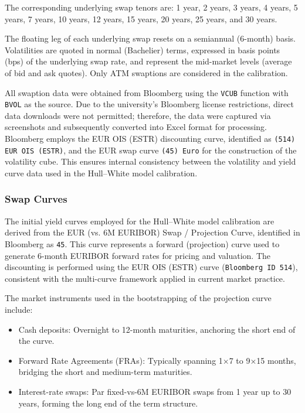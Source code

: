 The corresponding underlying swap tenors are:
1 year, 2 years, 3 years, 4 years, 5 years, 7 years, 10 years, 12 years, 15 years, 20 years, 25 years, and 30 years.

The floating leg of each underlying swap resets on a semiannual (6-month) basis. Volatilities are quoted in normal (Bachelier) terms, expressed in basis points (bps) of the underlying swap rate, and represent the mid-market levels (average of bid and ask quotes). Only ATM swaptions are considered in the calibration.

All swaption data were obtained from Bloomberg using the \texttt{VCUB} function with \texttt{BVOL} as the source. Due to the university's Bloomberg license restrictions, direct data downloads were not permitted; therefore, the data were captured via screenshots and subsequently converted into Excel format for processing. Bloomberg employs the EUR OIS (ESTR) discounting curve, identified as \texttt{(514) EUR OIS (ESTR)}, and the EUR swap curve \texttt{(45) Euro} for the construction of the volatility cube. This ensures internal consistency between the volatility and yield curve data used in the Hull–White model calibration.

\subsubsection{Swap Curves}
The initial yield curves employed for the Hull–White model calibration are derived from the EUR (vs. 6M EURIBOR) Swap / Projection Curve, identified in Bloomberg as \texttt{45}. This curve represents a forward (projection) curve used to generate 6-month EURIBOR forward rates for pricing and valuation. The discounting is performed using the EUR OIS (ESTR) curve (\texttt{Bloomberg ID 514}), consistent with the multi-curve framework applied in current market practice.

The market instruments used in the bootstrapping of the projection curve include:
\begin{itemize}
	\item Cash deposits: Overnight to 12-month maturities, anchoring the short end of the curve.
	\item Forward Rate Agreements (FRAs): Typically spanning 1×7 to 9×15 months, bridging the short and medium-term maturities.
	\item Interest-rate swaps: Par fixed-vs-6M EURIBOR swaps from 1 year up to 30 years, forming the long end of the term structure.
\end{itemize}


